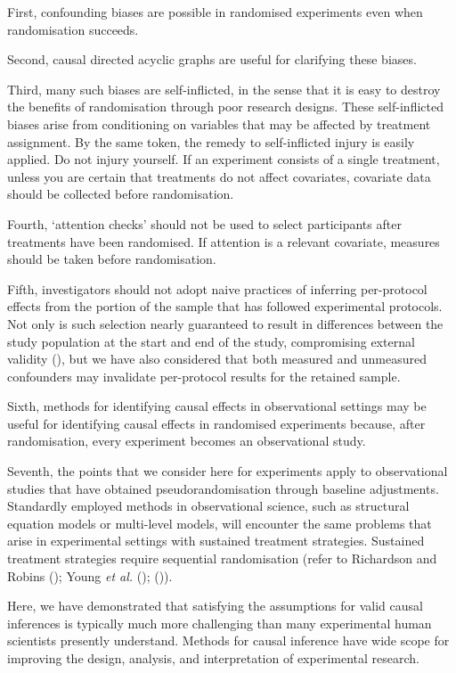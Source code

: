 \documentclass[
  single column]{article}
\begin{document}
First, confounding biases are possible in randomised experiments even
when randomisation succeeds.

Second, causal directed acyclic graphs are useful for clarifying these
biases.

Third, many such biases are self-inflicted, in the sense that it is easy
to destroy the benefits of randomisation through poor research designs.
These self-inflicted biases arise from conditioning on variables that
may be affected by treatment assignment. By the same token, the remedy
to self-inflicted injury is easily applied. Do not injury yourself. If
an experiment consists of a single treatment, unless you are certain
that treatments do not affect covariates, covariate data should be
collected before randomisation.

Fourth, `attention checks' should not be used to select participants
after treatments have been randomised. If attention is a relevant
covariate, measures should be taken before randomisation.

Fifth, investigators should not adopt naive practices of inferring
per-protocol effects from the portion of the sample that has followed
experimental protocols. Not only is such selection nearly guaranteed to
result in differences between the study population at the start and end
of the study, compromising external validity
(), but we have also considered that
both measured and unmeasured confounders may invalidate per-protocol
results for the retained sample.

Sixth, methods for identifying causal effects in observational settings
may be useful for identifying causal effects in randomised experiments
because, after randomisation, every experiment becomes an observational
study.

Seventh, the points that we consider here for experiments apply to
observational studies that have obtained pseudorandomisation through
baseline adjustments. Standardly employed methods in observational
science, such as structural equation models or multi-level models, will
encounter the same problems that arise in experimental settings with
sustained treatment strategies. Sustained treatment strategies require
sequential randomisation (refer to Richardson and Robins
(); Young \emph{et al.}
();
()).

Here, we have demonstrated that satisfying the assumptions for valid
causal inferences is typically much more challenging than many
experimental human scientists presently understand. Methods for causal
inference have wide scope for improving the design, analysis, and
interpretation of experimental research.
\end{document}
